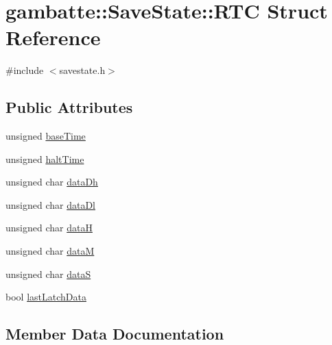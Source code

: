 \hypertarget{structgambatte_1_1SaveState_1_1RTC}{}\section{gambatte\+:\+:Save\+State\+:\+:R\+TC Struct Reference}
\label{structgambatte_1_1SaveState_1_1RTC}


{\ttfamily \#include $<$savestate.\+h$>$}

\subsection*{Public Attributes}
\begin{DoxyCompactItemize}
\item 
unsigned \hyperlink{structgambatte_1_1SaveState_1_1RTC_a441ef82323927a328d28a599852be171}{base\+Time}
\item 
unsigned \hyperlink{structgambatte_1_1SaveState_1_1RTC_ab1cdcfd9e72a6695e58e202b19b71d3a}{halt\+Time}
\item 
unsigned char \hyperlink{structgambatte_1_1SaveState_1_1RTC_a00e6b829e4f93ec000e5e82031cb240d}{data\+Dh}
\item 
unsigned char \hyperlink{structgambatte_1_1SaveState_1_1RTC_aa6e5bfa0f7fbb2cc1dd9c93e8fd0b559}{data\+Dl}
\item 
unsigned char \hyperlink{structgambatte_1_1SaveState_1_1RTC_a24f410edb5d2e87a56a4c42813a06955}{dataH}
\item 
unsigned char \hyperlink{structgambatte_1_1SaveState_1_1RTC_a347c08b72f0a2ce1fba5b2baa51d2c58}{dataM}
\item 
unsigned char \hyperlink{structgambatte_1_1SaveState_1_1RTC_a536837e9b15aaa9325f8d2d9e00cf9e0}{dataS}
\item 
bool \hyperlink{structgambatte_1_1SaveState_1_1RTC_a1b4ecf2213996ecbebf8f6bbb17de911}{last\+Latch\+Data}
\end{DoxyCompactItemize}


\subsection{Member Data Documentation}
\mbox{\label{structgambatte_1_1SaveState_1_1RTC_a441ef82323927a328d28a599852be171}} 
